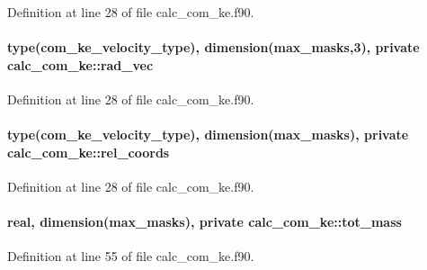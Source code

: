 Definition at line 28 of file calc\-\_\-com\-\_\-ke.\-f90.

\hypertarget{classcalc__com__ke_a61064252381e46ec3bd532069234fc1d}{
\paragraph[{rad\-\_\-vec}]{\setlength{\rightskip}{0pt plus 5cm}type({\bf com\-\_\-ke\-\_\-velocity\-\_\-type}), dimension({\bf max\-\_\-masks},3), private calc\-\_\-com\-\_\-ke\-::rad\-\_\-vec\hspace{0.3cm}{\ttfamily [private]}}}\label{classcalc__com__ke_a61064252381e46ec3bd532069234fc1d}


Definition at line 28 of file calc\-\_\-com\-\_\-ke.\-f90.

\hypertarget{classcalc__com__ke_adeeef7662bb6f9e230674e2cdd1a9052}{
\paragraph[{rel\-\_\-coords}]{\setlength{\rightskip}{0pt plus 5cm}type({\bf com\-\_\-ke\-\_\-velocity\-\_\-type}), dimension({\bf max\-\_\-masks}), private calc\-\_\-com\-\_\-ke\-::rel\-\_\-coords\hspace{0.3cm}{\ttfamily [private]}}}\label{classcalc__com__ke_adeeef7662bb6f9e230674e2cdd1a9052}


Definition at line 28 of file calc\-\_\-com\-\_\-ke.\-f90.

\hypertarget{classcalc__com__ke_a267edd7154fc7328559b2166aaa09a6f}{
\paragraph[{tot\-\_\-mass}]{\setlength{\rightskip}{0pt plus 5cm}real, dimension({\bf max\-\_\-masks}), private calc\-\_\-com\-\_\-ke\-::tot\-\_\-mass\hspace{0.3cm}{\ttfamily [private]}}}\label{classcalc__com__ke_a267edd7154fc7328559b2166aaa09a6f}


Definition at line 55 of file calc\-\_\-com\-\_\-ke.\-f90.


